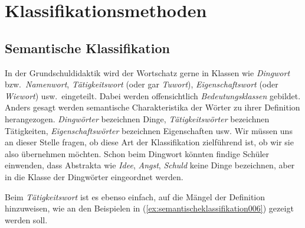 
\section{Klassifikationsmethoden}
\label{sec:klassifikationsmethoden}

\subsection{Semantische Klassifikation}
\label{sec:semantischeklassifikation}


In der Grundschuldidaktik wird der Wortschatz gerne in Klassen wie \textit{Dingwort} bzw.\ \textit{Namenwort}, \textit{Tätigkeitswort} (oder gar \textit{Tuwort}), \textit{Eigenschaftswort} (oder \textit{Wiewort}) usw.\ eingeteilt.
Dabei werden offensichtlich \textit{Bedeutungsklassen} gebildet.
Anders gesagt werden semantische Charakteristika der Wörter zu ihrer Definition herangezogen.
\textit{Dingwörter} bezeichnen Dinge, \textit{Tätigkeitswörter} bezeichnen Tätigkeiten, \textit{Eigenschaftswörter} bezeichnen Eigenschaften usw.
Wir müssen uns an dieser Stelle fragen, ob diese Art der Klassifikation zielführend ist, ob wir sie also übernehmen möchten.
Schon beim Dingwort könnten findige Schüler einwenden, dass Abstrakta wie \textit{Idee}, \textit{Angst}, \textit{Schuld} keine Dinge bezeichnen, aber in die Klasse der Dingwörter eingeordnet werden.

Beim \textit{Tätigkeitswort} ist es ebenso einfach, auf die Mängel der Definition hinzuweisen, wie an den Beispielen in (\ref{ex:semantischeklassifikation006}) gezeigt werden soll.

\begin{exe}
  \ex\label{ex:semantischeklassifikation006}
  \begin{xlist}
  \end{xlist}
\end{exe}

